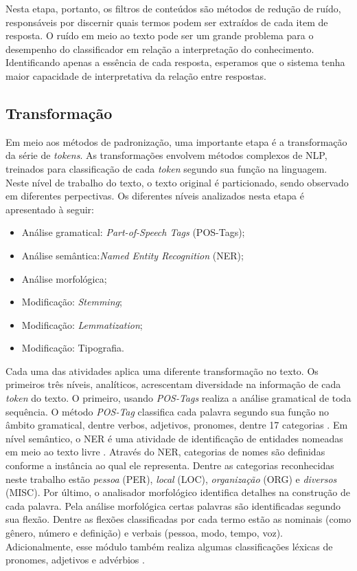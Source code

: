 Nesta etapa, portanto, os filtros de conteúdos são métodos de redução de ruído, responsáveis por discernir quais termos podem ser extraídos de cada item de resposta. O ruído em meio ao texto pode ser um grande problema para o desempenho do classificador em relação a interpretação do conhecimento. Identificando apenas a essência de cada resposta, esperamos que o sistema tenha maior capacidade de interpretativa da relação entre respostas.

\subsection{Transformação}
\label{subsec-transformacao}

Em meio aos métodos de padronização, uma importante etapa é a transformação da série de \textit{tokens}. As transformações envolvem métodos complexos de NLP, treinados para classificação de cada \textit{token} segundo sua função na linguagem. Neste nível de trabalho do texto, o texto original é particionado, sendo observado em diferentes perpectivas. Os diferentes níveis analizados nesta etapa é apresentado à seguir:

\begin{itemize}
	\item Análise gramatical: \textit{Part-of-Speech Tags} (POS-Tags);
	\item Análise semântica:\textit{Named Entity Recognition} (NER);
	\item Análise morfológica;
	\item Modificação: \textit{Stemming};
	\item Modificação: \textit{Lemmatization};
	\item Modificação: Tipografia.
\end{itemize}

Cada uma das atividades aplica uma diferente transformação no texto. Os primeiros três níveis, analíticos, acrescentam diversidade na informação de cada \textit{token} do texto. O primeiro, usando \textit{POS-Tags} realiza a análise gramatical de toda sequência. O método \textit{POS-Tag} classifica cada palavra segundo sua função no âmbito gramatical, dentre verbos, adjetivos, pronomes, dentre 17 categorias \cite{marneffe2021}. Em nível semântico, o NER é uma atividade de identificação de entidades nomeadas em meio ao texto livre \cite{pirovani2019}. Através do NER, categorias de nomes são definidas conforme a instância ao qual ele representa. Dentre as categorias reconhecidas neste trabalho estão \textit{pessoa} (PER), \textit{local} (LOC), \textit{organização} (ORG) e \textit{diversos} (MISC). Por último, o analisador morfológico identifica detalhes na construção de cada palavra. Pela análise morfológica certas palavras são identificadas segundo sua flexão. Dentre as flexões classificadas por cada termo estão as nominais (como gênero, número e definição) e verbais (pessoa, modo, tempo, voz). Adicionalmente, esse módulo também realiza algumas classificações léxicas de pronomes, adjetivos e advérbios \cite{marneffe2021}.

